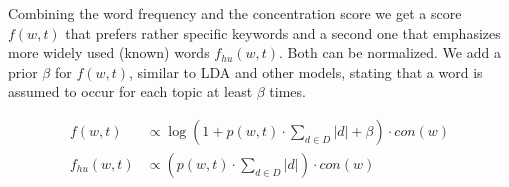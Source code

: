 \documentclass[twocolumn,10]{article}
\newcommand{\ci}{~\cite} \newcommand{\re}{~\ref} \newcommand{\ma}{\mathbb}
\begin{document}
	\noindent Combining the word frequency and the concentration score we get a score $f(w,t)$ that prefers rather specific keywords and a second one that emphasizes more widely used (known) words $f_{hu}(w,t)$. Both can be normalized. We add a prior $\beta$ for $f(w,t)$, similar to LDA and other models, stating that a word is assumed to occur for each topic at least $\beta$ times.
			\vspace{-3pt}
		\begin{small}
		\begin{equation} \begin{aligned}
		f(w,t)&\propto \log(1+p(w,t)\cdot \sum_{d\in D}|d|+\beta)\cdot con(w)  \\ 	%
		f_{hu}(w,t) &\propto (p(w,t)\cdot \sum_{d\in D}|d|)\cdot con(w) \label{eq:pwt} %
		\end{aligned}   \end{equation} 
	\end{small}	
	\vspace{-15pt}
\end{document}
